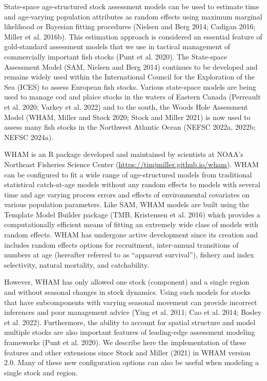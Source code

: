 \documentclass[
]{article}
\begin{document}
State-space age-structured stock assessment models can be used to estimate time and age-varying population attributes as random effects using maximum marginal likelihood or Bayesian fitting procedures (Nielsen and Berg 2014; Cadigan 2016; Miller et al. 2016b). This estimation approach is considered an essential feature of gold-standard assessment models that we use in tactical management of commercially important fish stocks (Punt et al. 2020). The State-space Assessment Model (SAM, Nielsen and Berg 2014) continues to be developed and remains widely used within the International Council for the Exploration of the Sea (ICES) to assess European fish stocks. Various state-space models are being used to manage cod and plaice stocks in the waters of Eastern Canada (Perreault et al. 2020; Varkey et al. 2022) and to the south, the Woods Hole Assessment Model (WHAM, Miller and Stock 2020; Stock and Miller 2021) is now used to assess many fish stocks in the Northwest Atlantic Ocean (NEFSC 2022a, 2022b; NEFSC 2024a).

WHAM is an R package developed and maintained by scientists at NOAA's Northeast Fisheries Science Center (\url{https://timjmiller.github.io/wham}). WHAM can be configured to fit a wide range of age-structured models from traditional statistical catch-at-age models without any random effects to models with several time and age varying process errors and effects of environmental covariates on various population parameters. Like SAM, WHAM models are built using the Template Model Builder package (TMB, Kristensen et al. 2016) which provides a computationally efficient means of fitting an extremely wide class of models with random effects. WHAM has undergone active development since its creation and includes random effects options for recruitment, inter-annual transitions of numbers at age (hereafter referred to as ``apparent survival''), fishery and index selectivity, natural mortality, and catchability.

However, WHAM has only allowed one stock (component) and a single region and without seasonal changes in stock dynamics. Using such models for stocks that have subcomponents with varying seasonal movement can provide incorrect inferences and poor management advice (Ying et al. 2011; Cao et al. 2014; Bosley et al. 2022). Furthermore, the ability to account for spatial structure and model multiple stocks are also important features of leading-edge assessment modeling frameworks (Punt et al. 2020). We describe here the implementation of these features and other extensions since Stock and Miller (2021) in WHAM version 2.0. Many of these new configuration options can also be useful when modeling a single stock and region.
\end{document}
